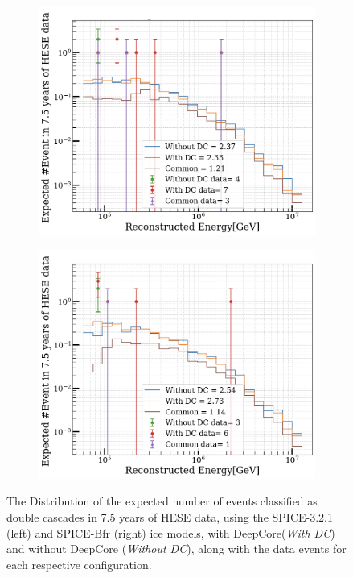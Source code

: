 \begin{figure}
    \begin{subfigure}[h]{0.7\textwidth}
        \includegraphics{./figures/results/Spice_DCwithdata.png}
    \end{subfigure}
    \hfill
    \begin{subfigure}[h]{0.7\textwidth}
        \includegraphics{./figures/results/Bfr_DCwithdata.png}
       
    \end{subfigure}%
    \caption[Data/MC distribution of HESE-7.5, using Spice-3.2.1 and Spice-Bfr icemodels, with and without DeepCore DOMs]{The Distribution of the expected number of events classified as double cascades in 7.5 years of HESE data, using the SPICE-3.2.1 (left) and SPICE-Bfr (right) ice models, with DeepCore(\emph{With DC}) and without DeepCore (\emph{Without DC}), along with the data events for each respective configuration.}
\end{figure}


